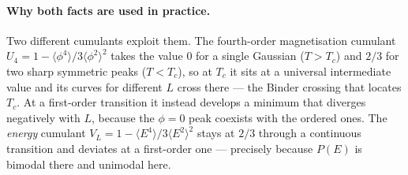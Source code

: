 \documentclass[10pt,a4paper]{article}
\theoremstyle{remark}
\begin{document}
\paragraph{Why both facts are used in practice.} Two different cumulants exploit
them. The fourth-order magnetisation cumulant
$U_4=1-\langle\phi^4\rangle/3\langle\phi^2\rangle^2$ takes the value $0$ for a
single Gaussian ($T>T_c$) and $2/3$ for two sharp symmetric peaks ($T<T_c$), so
at $T_c$ it sits at a universal intermediate value and its curves for different
$L$ cross there --- the Binder crossing that locates $T_c$. At a first-order
transition it instead develops a minimum that diverges negatively with $L$,
because the $\phi=0$ peak coexists with the ordered ones. The \emph{energy}
cumulant $V_L=1-\langle E^4\rangle/3\langle E^2\rangle^2$ stays at $2/3$ through a
continuous transition and deviates at a first-order one --- precisely because
$P(E)$ is bimodal there and unimodal here.
\end{document}
